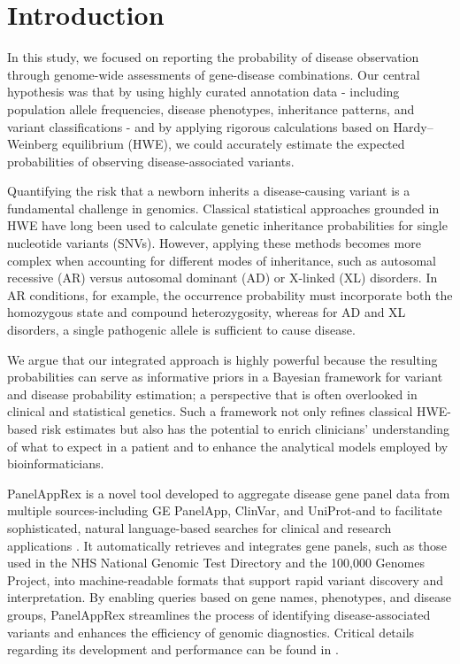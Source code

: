 \section{Introduction}

In this study, we focused on reporting the probability of disease observation through genome-wide assessments of gene-disease combinations. Our central hypothesis was that by using highly curated annotation data - including population allele frequencies, disease phenotypes, inheritance patterns, and variant classifications - and by applying rigorous calculations based on Hardy–Weinberg equilibrium (HWE), we could accurately estimate the expected probabilities of observing disease-associated variants.

Quantifying the risk that a newborn inherits a disease-causing variant is a fundamental challenge in genomics. Classical statistical approaches grounded in HWE \cite{MayoCentury2008, AbramovsHardyWeinberg2020} have long been used to calculate genetic inheritance probabilities for single nucleotide variants (SNVs). However, applying these methods becomes more complex when accounting for different modes of inheritance, such as autosomal recessive (AR) versus autosomal dominant (AD) or X-linked (XL) disorders. In AR conditions, for example, the occurrence probability must incorporate both the homozygous state and compound heterozygosity, whereas for AD and XL disorders, a single pathogenic allele is sufficient to cause disease.

We argue that our integrated approach is highly powerful because the resulting probabilities can serve as informative priors in a Bayesian framework for variant and disease probability estimation; a perspective that is often overlooked in clinical and statistical genetics. Such a framework not only refines classical HWE-based risk estimates but also has the potential to enrich clinicians’ understanding of what to expect in a patient and to enhance the analytical models employed by bioinformaticians.

PanelAppRex is a novel tool developed to aggregate disease gene panel data from multiple sources-including GE PanelApp, ClinVar, and UniProt-and to facilitate sophisticated, natural language-based searches for clinical and research applications
\cite{lawless_panelapprex_2025}. It automatically retrieves and integrates gene panels, such as those used in the NHS National Genomic Test Directory and the 100,000 Genomes Project, into machine-readable formats that support rapid variant discovery and interpretation. By enabling queries based on gene names, phenotypes, and disease groups, PanelAppRex streamlines the process of identifying disease-associated variants and enhances the efficiency of genomic diagnostics. Critical details regarding its development and performance can be found in \cite{martin_panelapp_2019, landrum_clinvar_2018, the_uniprot_consortium_uniprot_2025}.

